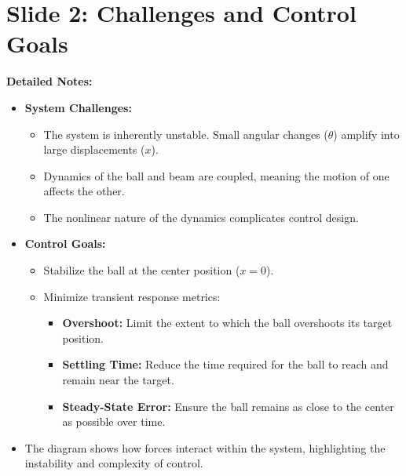 \documentclass[12pt]{article}
\begin{document}
\section*{Slide 2: Challenges and Control Goals}
\textbf{Detailed Notes:}
\begin{itemize}
    \item \textbf{System Challenges:}
    \begin{itemize}
        \item The system is inherently unstable. Small angular changes (\(\theta\)) amplify into large displacements (\(x\)).
        \item Dynamics of the ball and beam are coupled, meaning the motion of one affects the other.
        \item The nonlinear nature of the dynamics complicates control design.
    \end{itemize}
    \item \textbf{Control Goals:}
    \begin{itemize}
        \item Stabilize the ball at the center position (\(x = 0\)).
        \item Minimize transient response metrics:
        \begin{itemize}
            \item \textbf{Overshoot:} Limit the extent to which the ball overshoots its target position.
            \item \textbf{Settling Time:} Reduce the time required for the ball to reach and remain near the target.
            \item \textbf{Steady-State Error:} Ensure the ball remains as close to the center as possible over time.
        \end{itemize}
    \end{itemize}
    \item The diagram shows how forces interact within the system, highlighting the instability and complexity of control.
\end{itemize}

\newpage
\end{document}
